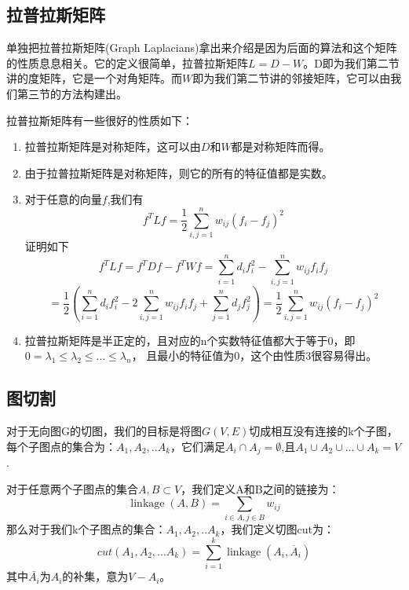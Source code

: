 \subsection{拉普拉斯矩阵}
单独把拉普拉斯矩阵(Graph Laplacians)拿出来介绍是因为后面的算法和这个矩阵的性质息息相关。它的定义很简单，拉普拉斯矩阵$L=D-W$。D即为我们第二节讲的度矩阵，它是一个对角矩阵。而$W$即为我们第二节讲的邻接矩阵，它可以由我们第三节的方法构建出。

拉普拉斯矩阵有一些很好的性质如下：
\begin{enumerate}
    \item 拉普拉斯矩阵是对称矩阵，这可以由$D$和$W$都是对称矩阵而得。
    \item 由于拉普拉斯矩阵是对称矩阵，则它的所有的特征值都是实数。
    \item 对于任意的向量$f$,我们有
    \begin{equation}
    f^TLf = \frac{1}{2}\sum\limits_{i,j=1}^{n}w_{ij}(f_i-f_j)^2
    \end{equation}
    证明如下
    \begin{equation}
    f^TLf = f^TDf - f^TWf = \sum\limits_{i=1}^{n}d_if_i^2 - \sum\limits_{i,j=1}^{n}w_{ij}f_if_j
    \end{equation}
    \begin{equation}
    =\frac{1}{2}( \sum\limits_{i=1}^{n}d_if_i^2 - 2 \sum\limits_{i,j=1}^{n}w_{ij}f_if_j + \sum\limits_{j=1}^{n}d_jf_j^2) = \frac{1}{2}\sum\limits_{i,j=1}^{n}w_{ij}(f_i-f_j)^2
    \end{equation}
    \item 拉普拉斯矩阵是半正定的，且对应的n个实数特征值都大于等于0，即$0 =\lambda_1 \leq \lambda_2 \leq... \leq \lambda_n$， 且最小的特征值为0，这个由性质3很容易得出。
\end{enumerate}

\subsection{图切割}
        
对于无向图G的切图，我们的目标是将图$G(V,E)$切成相互没有连接的k个子图，每个子图点的集合为：$A_1,A_2,..A_k$，它们满足$A_i \cap A_j = \emptyset$,且$A_1 \cup A_2 \cup ... \cup A_k = V$.

对于任意两个子图点的集合$A, B \subset V$，我们定义A和B之间的链接为：
\begin{equation}
\operatorname{linkage}(A, B) = \sum\limits_{i \in A, j \in B}w_{ij}
\end{equation}
那么对于我们k个子图点的集合：$A_1,A_2,..A_k$，我们定义切图cut为：
\begin{equation}
cut(A_1,A_2,...A_k) = \sum\limits_{i=1}^{k}\operatorname{linkage}(A_i, \overline{A}_i )
\end{equation}
其中$\bar{A_i}$为$A_i$的补集，意为$V - A_i$。

